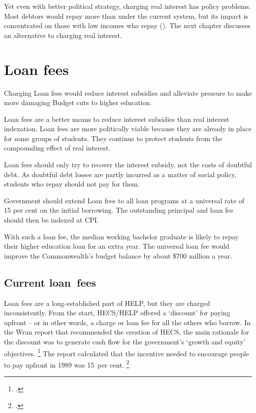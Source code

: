 \documentclass{grattan}
\begin{document}
Yet even with better political strategy, charging real interest has policy problems.
Most debtors would repay more than under the current system, but its impact is concentrated on those with low incomes who repay ().
The next chapter discusses an alternative to charging real interest.

\chapter{Loan fees}\label{chap:6-loan-fee}

Charging \gls{Loan fees} would reduce interest subsidies and alleviate pressure to make more damaging Budget cuts to higher education.

\Gls{Loan fees} are a better means to reduce interest subsidies than real interest indexation. \Gls{Loan fees} are more politically viable because they are already in place for some groups of students.
They continue to protect students from the compounding effect of real interest.

\Gls{Loan fees} should only try to recover the interest subsidy, not the costs of doubtful debt. As doubtful debt losses are partly incurred as a matter of social policy, students who repay should not pay for them.

Government should extend \gls{Loan fees} to all loan programs at a universal rate of 15 per cent on the initial borrowing. The outstanding principal and loan fee should then be indexed at \gls{CPI}.

With such a loan fee, the median working bachelor graduate is likely to repay their higher education loan for an extra year. The universal loan fee would improve the Commonwealth's budget balance by about \$700 million a year. 

\section{Current loan~fees}\label{sec:current-loan-fees}

\Gls{Loan fees} are a long-established part of \gls{HELP}\@, but they are charged inconsistently. From the start, \gls{HECS}/\gls{HELP} offered a `discount' for paying upfront -- or in other words, a charge or loan fee for all the others who borrow.
In the Wran report that recommended the creation of \gls{HECS}, the main rationale for the discount was to generate cash flow for the government's `growth and equity' objectives.%
\footcite[][79]{Wran1988ReportCommitteeHigher} %
The report calculated that the incentive needed to encourage people to pay upfront in 1989 was 15~per cent.%
\footcite[][93--94]{Wran1988ReportCommitteeHigher} 
\end{document}
